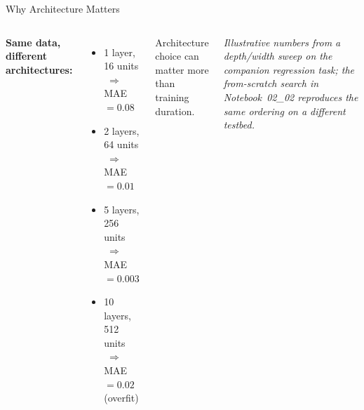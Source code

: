 \documentclass[aspectratio=169,11pt]{beamer}
\newcommand{\emphc}[1]{\textcolor{harvardcrimson}{#1}}
\begin{document}
\begin{frame}{Why Architecture Matters}
\begin{columns}[T]
\textbf{Same data, different architectures:}
\vspace{0.3cm}
\begin{itemize}
    \item 1 layer, 16 units $\;\Rightarrow\;$ MAE $= 0.08$
    \item 2 layers, 64 units $\;\Rightarrow\;$ MAE $= 0.01$
    \item 5 layers, 256 units $\;\Rightarrow\;$ MAE $= 0.003$
    \item 10 layers, 512 units $\;\Rightarrow\;$ MAE $= 0.02$ (overfit)
\end{itemize}
\vspace{0.3cm}
Architecture choice can matter \emphc{more than training duration}.

\vspace{0.25cm}
{\scriptsize\itshape Illustrative numbers from a depth/width sweep on the companion regression task; the from-scratch search in Notebook~02\_02 reproduces the same ordering on a different testbed.}

\end{columns}
\end{frame}
\end{document}
